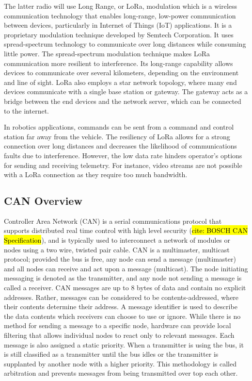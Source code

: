 The latter radio will use Long Range, or LoRa, modulation which is a wireless communication technology that enables long-range, low-power communication between devices, particularly in Internet of Things (IoT) applications. 
It is a proprietary modulation technique developed by Semtech Corporation. 
It uses spread-spectrum technology to communicate over long distances while consuming little power. 
The spread-spectrum modulation technique makes LoRa communication more resilient to interference. 
Its long-range capability allows devices to communicate over several kilometers, depending on the environment and line of sight. 
LoRa also employs a star network topology, where many end devices communicate with a single base station or gateway. 
The gateway acts as a bridge between the end devices and the network server, which can be connected to the internet. 

In robotics applications, commands can be sent from a command and control station far away from the vehicle.
The resiliency of LoRa allows for a strong connection over long distances and decreases the likelihood of communications faults due to interference.
However, the low data rate hinders operator's options for sending and receiving telemetry.
For instance, video streams are not possible with a LoRa connection as they require too much bandwidth.

\subsection{CAN Overview}
Controller Area Network (CAN) is a serial communications protocol that supports distributed real time control with high level security (\hl{cite: BOSCH CAN Specification}), and is typically used to interconnect a network of modules or nodes using a two wire, twisted pair cable.
CAN is a multimaster, multicast protocol; provided the bus is free, any node can send a message (multimaster) and all nodes can receive and act upon a message (multicast). 
The node initiating messaging is denoted as the transmitter, and any node not sending a message is called a receiver. 
CAN messages are up to 8 bytes of data and contain no explicit addresses. 
Rather, messages can be considered to be contents-addressed, where their contents determine their address. 
A message identifier is used to describe the data contents which receivers can choose to use or ignore. 
While there is no method for sending a message to a specific node, hardware can provide local filtering that allows individual nodes to react only to relevant messages.
Each message is also assigned a static priority.
When a transmitter is using the bus, it is still classified as a transmitter until the bus idles or the transmitter is supplanted by another node with a higher priority.
This methodology is called arbitration and prevents messages from being transmitted over top each other.

